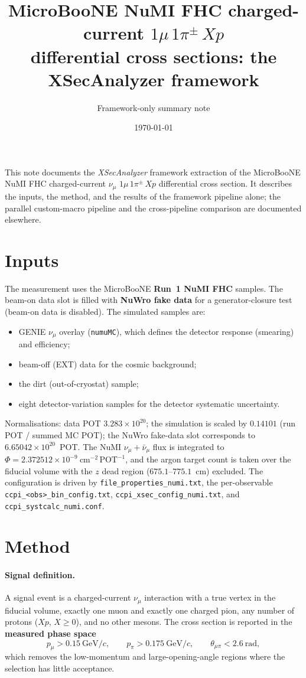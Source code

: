 \documentclass[11pt]{article}
\title{MicroBooNE NuMI FHC charged-current \boldmath$1\mu\,1\pi^{\pm}\,Xp$\\
       differential cross sections: the XSecAnalyzer framework}
\author{Framework-only summary note}
\date{\today}
\begin{document}
\maketitle

\noindent
This note documents the \emph{XSecAnalyzer} framework extraction of the
MicroBooNE NuMI FHC charged-current $\nu_\mu$ $1\mu\,1\pi^{\pm}\,Xp$ differential
cross section. It describes the inputs, the method, and the results of the
framework pipeline alone; the parallel custom-macro pipeline and the
cross-pipeline comparison are documented elsewhere.

\section{Inputs}
\label{sec:inputs}

The measurement uses the MicroBooNE \textbf{Run~1 NuMI FHC} samples. The beam-on
data slot is filled with \textbf{NuWro fake data} for a generator-closure test
(beam-on data is disabled). The simulated samples are:
\begin{itemize}
  \item GENIE $\nu_\mu$ overlay (\texttt{numuMC}), which defines the detector
        response (smearing) and efficiency;
  \item beam-off (EXT) data for the cosmic background;
  \item the dirt (out-of-cryostat) sample;
  \item eight detector-variation samples for the detector systematic uncertainty.
\end{itemize}
Normalisations: data POT $3.283\times10^{20}$; the simulation is scaled by
$0.14101$ (run POT / summed MC POT); the NuWro fake-data slot corresponds to
$6.65042\times10^{20}$~POT. The NuMI $\nu_\mu+\bar\nu_\mu$ flux is integrated to
$\Phi = 2.372512\times10^{-9}~\mathrm{cm^{-2}\,POT^{-1}}$, and the argon target
count is taken over the fiducial volume with the $z$ dead region
($675.1$--$775.1$~cm) excluded. The configuration is driven by
\texttt{file\_properties\_numi.txt}, the per-observable
\texttt{ccpi\_<obs>\_bin\_config.txt}, \texttt{ccpi\_xsec\_config\_numi.txt}, and
\texttt{ccpi\_systcalc\_numi.conf}.

\section{Method}
\label{sec:method}

\paragraph{Signal definition.}
A signal event is a charged-current $\nu_\mu$ interaction with a true vertex in
the fiducial volume, exactly one muon and exactly one charged pion, any number of
protons ($Xp$, $X\ge0$), and no other mesons. The cross section is reported in
the \textbf{measured phase space}
\begin{equation}
  p_\mu > 0.15~\mathrm{GeV}/c,\qquad
  p_\pi > 0.175~\mathrm{GeV}/c,\qquad
  \theta_{\mu\pi} < 2.6~\mathrm{rad},
\end{equation}
which removes the low-momentum and large-opening-angle regions where the
selection has little acceptance.
\end{document}
